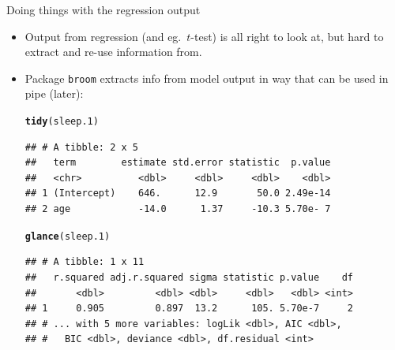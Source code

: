 \documentclass[unknownkeysallowed]{beamer}\usepackage[]{graphicx}\usepackage[]{color}
\makeatletter
\newcommand{\hlstd}[1]{\textcolor[rgb]{0.345,0.345,0.345}{#1}}%
\newcommand{\hlkwd}[1]{\textcolor[rgb]{0.737,0.353,0.396}{\textbf{#1}}}%
\newenvironment{kframe}{%
 \def\at@end@of@kframe{}%
 \ifinner\ifhmode%
  \def\at@end@of@kframe{\end{minipage}}%
  \begin{minipage}{\columnwidth}%
 \fi\fi%
 \def\FrameCommand##1{\hskip\@totalleftmargin \hskip-\fboxsep
 \colorbox{shadecolor}{##1}\hskip-\fboxsep
     \hskip-\linewidth \hskip-\@totalleftmargin \hskip\columnwidth}%
 \MakeFramed {\advance\hsize-\width
   \@totalleftmargin\z@ \linewidth\hsize
   \@setminipage}}%
 {\par\unskip\endMakeFramed%
 \at@end@of@kframe}
\newenvironment{knitrout}{}{} %
\makeatother
\begin{document}
\begin{frame}[fragile]{Doing things with the regression output}
  
  \begin{itemize}
  \item Output from regression (and eg.\ $t$-test) is all right to
    look at, but hard to extract and re-use information from.
  \item Package \texttt{broom} extracts info from model output in way
    that can be used in pipe (later):
    
\begin{knitrout}\footnotesize
{}\color{fgcolor}\begin{kframe}
\begin{alltt}
\hlkwd{tidy}\hlstd{(sleep.1)}
\end{alltt}
\begin{verbatim}
## # A tibble: 2 x 5
##   term        estimate std.error statistic  p.value
##   <chr>          <dbl>     <dbl>     <dbl>    <dbl>
## 1 (Intercept)    646.      12.9       50.0 2.49e-14
## 2 age            -14.0      1.37     -10.3 5.70e- 7
\end{verbatim}
\begin{alltt}
\hlkwd{glance}\hlstd{(sleep.1)}
\end{alltt}
\begin{verbatim}
## # A tibble: 1 x 11
##   r.squared adj.r.squared sigma statistic p.value    df
##       <dbl>         <dbl> <dbl>     <dbl>   <dbl> <int>
## 1     0.905         0.897  13.2      105. 5.70e-7     2
## # ... with 5 more variables: logLik <dbl>, AIC <dbl>,
## #   BIC <dbl>, deviance <dbl>, df.residual <int>
\end{verbatim}
\end{kframe}
\end{knitrout}
  \end{itemize}
  
\end{frame}
\end{document}
